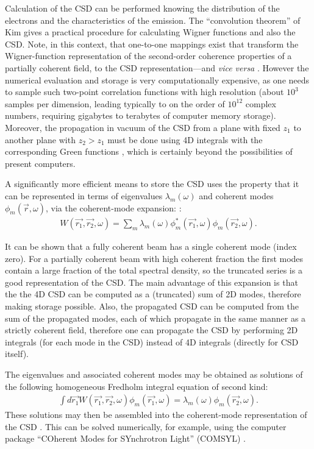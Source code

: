 \documentclass{iucr}              %
\newcommand{\conj}[1]{#1^*}
\begin{document}
Calculation of the CSD can be performed knowing the distribution of the electrons and the characteristics of the emission. The ``convolution theorem'' of Kim \citeyear{kim} gives a practical procedure for calculating Wigner functions \cite{Wigner1932} and also the CSD. Note, in this context, that one-to-one mappings exist that transform the Wigner-function representation of the second-order coherence properties of a partially coherent field, to the CSD representation---and {\em vice versa} \cite{AlonsoWignerFunctionReview}.  However the numerical evaluation and storage is very computationally expensive, as one needs to sample such two-point correlation functions with high resolution (about $10^3$ samples per dimension, leading typically to on the order of $10^{12}$ complex numbers, requiring gigabytes to terabytes of computer memory storage). Moreover, the propagation in vacuum of the CSD from a plane with fixed $z_1$ to another plane with $z_2>z_1$ must be done using 4D integrals with the corresponding Green functions \cite{mandel_wolf}, which is certainly beyond the possibilities of present computers. 

A significantly more efficient means to store the CSD uses the property that it can be represented in terms of eigenvalues $\lambda_m(\omega)$ and coherent modes $\phi_m(\vec{r}, \omega)$, via the coherent-mode expansion:
\cite{Wolf1982,mandel_wolf}:
\begin{equation}
\begin{aligned}
W(\vec{r_1}, \vec{r_2}, \omega)
=
\sum_m
\lambda_m(\omega)
\conj\phi_m(\vec{r_1},\omega)
\phi_m(\vec{r_2}, \omega).
\end{aligned}
\end{equation}

It can be shown that a fully coherent beam has a single coherent mode (index zero). For a partially coherent beam with high coherent fraction the first modes contain a large fraction of the total spectral density, so the truncated series is a good representation of the CSD. The main advantage of this expansion is that the the 4D CSD can be computed as a (truncated) sum of 2D modes, therefore making storage possible. Also, the propagated CSD can be computed from the sum of the propagated modes, each of which propagate in the same manner as a strictly coherent field, therefore one can propagate the CSD by performing 2D integrals (for each mode in the CSD) instead of 4D integrals (directly for CSD itself).  

The eigenvalues and associated coherent modes may be obtained as solutions of the following homogeneous Fredholm integral equation of second kind:
\begin{equation}
\begin{aligned}
\label{fredholm_equation}
\int d\vec{r_1}
W(\vec{r_1},\vec{r_2}, \omega){\phi}_m(\vec{r_1},
\omega)=\lambda_m(\omega)\phi_m(\vec{r_2}, \omega).
\end{aligned}
\end{equation}
These solutions may then be assembled into the coherent-mode representation of the CSD \cite{Wolf1982}.  This can be solved numerically, for example, using the computer package ``COherent Modes for SYnchrotron Light'' (COMSYL) \cite{glass}.
\end{document}
